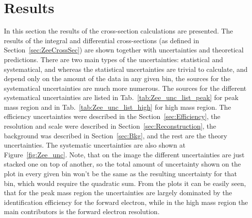 \chapter{Results}
\label{sec:Results}

In this section the results of the cross-section calculations are presented. The results of the integral and differential cross-sections (as defined in Section~\ref{sec:ZeeCrossSec}) are shown together with uncertainties and theoretical predictions. There are two main types of the uncertainties: statistical and systematical, and whereas the statistical uncertainties are trivial to calculate, and depend only on the amount of the data in any given bin, the sources for the systematical uncertainties are much more numerous. The sources for the different systematical uncertainties are listed in Tab.~\ref{tab:Zee_unc_list_peak} for peak mass region and in Tab.~\ref{tab:Zee_unc_list_high} for high mass region. The efficiency uncertainties were described in the Section~\ref{sec:Efficiency}, the resolution and scale were described in Section~\ref{sec:Reconstruction}, the background was described in Section~\ref{sec:Bkg}, and the rest are the theory uncertainties. The systematic uncertainties are also shown at Figure~\ref{fig:Zee_unc}. Note, that on the image the different uncertainties are just stacked one on top of another, so the total amount of uncertainty shown on the plot in every given bin won't be the same as the resulting uncertainty for that bin, which would require the quadratic sum. From the plots it can be easily seen, that for the peak mass region the uncertainties are largely dominated by the identification efficiency for the forward electron, while in the high mass region the main contributors is the forward electron resolution.

